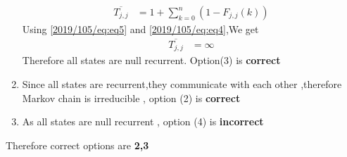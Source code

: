 \begin{enumerate}
\begin{align}
    \overline{T_{j,j}}&=1 + \sum _{k=0}^n (1 - F_{j,j}(k))
    \label{2019/105/eq:eq5}
\end{align}
Using \eqref{2019/105/eq:eq5} and \eqref{2019/105/eq:eq4},We get 
\begin{align}
    \overline{T_{j,j}}& = \infty
\end{align}
Therefore all states are null recurrent.
Option(3) is \textbf{correct}
 \item
    Since all states are recurrent,they communicate with each other ,therefore Markov chain is irreducible , option (2) is \textbf{correct}
 \item As all states are null recurrent , option (4) is \textbf{incorrect} 
\end{enumerate}
Therefore correct options are \textbf{2,3}
